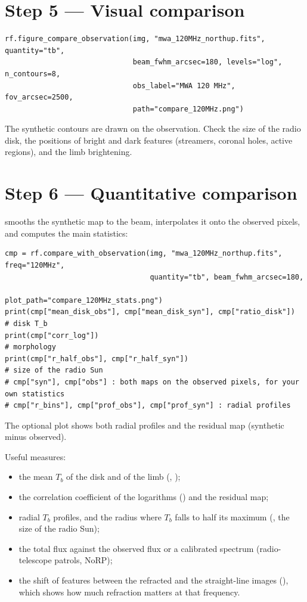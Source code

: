 \section*{Step 5 --- Visual comparison}
\begin{lstlisting}[style=pyex]
rf.figure_compare_observation(img, "mwa_120MHz_northup.fits", quantity="tb",
                              beam_fwhm_arcsec=180, levels="log", n_contours=8,
                              obs_label="MWA 120 MHz", fov_arcsec=2500,
                              path="compare_120MHz.png")
\end{lstlisting}
The synthetic contours are drawn on the observation. Check the size of the radio disk,
the positions of bright and dark features (streamers, coronal holes, active regions), and
the limb brightening.

\section*{Step 6 --- Quantitative comparison}
 smooths the synthetic map to the beam, interpolates it
onto the observed pixels, and computes the main statistics:
\begin{lstlisting}[style=pyex]
cmp = rf.compare_with_observation(img, "mwa_120MHz_northup.fits", freq="120MHz",
                                  quantity="tb", beam_fwhm_arcsec=180,
                                  plot_path="compare_120MHz_stats.png")
print(cmp["mean_disk_obs"], cmp["mean_disk_syn"], cmp["ratio_disk"])   # disk T_b
print(cmp["corr_log"])                                                 # morphology
print(cmp["r_half_obs"], cmp["r_half_syn"])                            # size of the radio Sun
# cmp["syn"], cmp["obs"] : both maps on the observed pixels, for your own statistics
# cmp["r_bins"], cmp["prof_obs"], cmp["prof_syn"] : radial profiles
\end{lstlisting}
The optional plot shows both radial profiles and the residual map (synthetic minus
observed).

Useful measures:
\begin{itemize}[itemsep=1pt]
\item the mean $T_b$ of the disk and of the limb (, );
\item the correlation coefficient of the logarithms () and the residual map;
\item radial $T_b$ profiles, and the radius where $T_b$ falls to half its maximum
      (, the size of the radio Sun);
\item the total flux  against the observed flux or a
      calibrated spectrum (radio-telescope patrols, NoRP);
\item the shift of features between the refracted and the straight-line images
      (), which shows how much refraction matters at that
      frequency.
\end{itemize}

